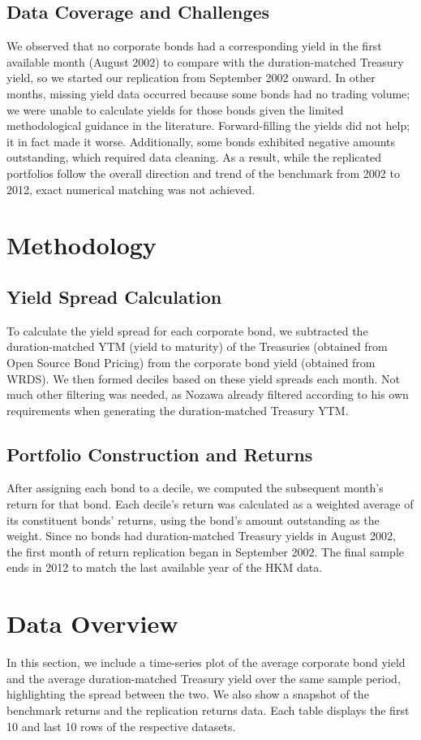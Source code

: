 \documentclass[12pt]{article}
\begin{document}
\subsection{Data Coverage and Challenges}
We observed that no corporate bonds had a corresponding yield in the first available month (August 2002) to compare with the duration-matched Treasury yield, so we started our replication from September 2002 onward. In other months, missing yield data occurred because some bonds had no trading volume; we were unable to calculate yields for those bonds given the limited methodological guidance in the literature. Forward-filling the yields did not help; it in fact made it worse. Additionally, some bonds exhibited negative amounts outstanding, which required data cleaning. As a result, while the replicated portfolios follow the overall direction and trend of the benchmark from 2002 to 2012, exact numerical matching was not achieved.

\section{Methodology}
\subsection{Yield Spread Calculation}
To calculate the yield spread for each corporate bond, we subtracted the duration-matched YTM (yield to maturity) of the Treasuries (obtained from Open Source Bond Pricing) from the corporate bond yield (obtained from WRDS). We then formed deciles based on these yield spreads each month. Not much other filtering was needed, as Nozawa already filtered according to his own requirements when generating the duration-matched Treasury YTM.

\subsection{Portfolio Construction and Returns}
After assigning each bond to a decile, we computed the subsequent month’s return for that bond. Each decile’s return was calculated as a weighted average of its constituent bonds’ returns, using the bond’s amount outstanding as the weight. Since no bonds had duration-matched Treasury yields in August 2002, the first month of return replication began in September 2002. The final sample ends in 2012 to match the last available year of the HKM data.

\section{Data Overview}
In this section, we include a time-series plot of the average corporate bond yield and the average duration-matched Treasury yield over the same sample period, highlighting the spread between the two. We also show a snapshot of the benchmark returns and the replication returns data. Each table displays the first 10 and last 10 rows of the respective datasets. 
\end{document}
